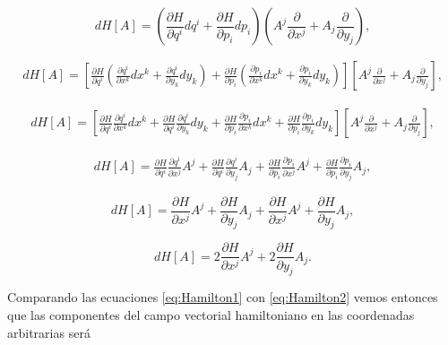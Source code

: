\documentclass[a4paper,10pt]{article}
\numberwithin{equation}{section}
\begin{document}
\begin{equation}
 dH[A] = \left( \frac{\partial H}{\partial q^i}dq^i + \frac{\partial H}{\partial p_i}dp_i\right)
 \left(A^j\frac{\partial}{\partial x^j} + A_j \frac{\partial}{\partial y_j}\right),
\end{equation}

\begin{align*}
 dH[A] = \left[ \frac{\partial H}{\partial q^i}\left(\frac{\partial q^i}{\partial x^k}dx^k + \frac{\partial q^i}{\partial y_k}dy_k  \right)
 + \frac{\partial H}{\partial p_i}\left(\frac{\partial p_i}{\partial x^k}dx^k + \frac{\partial p_i}{\partial y_k}dy_k  \right)\right]
 \left[A^j\frac{\partial}{\partial x^j} + A_j \frac{\partial}{\partial y_j}\right],
\end{align*}

\begin{align*}
 dH[A] = \left[ \frac{\partial H}{\partial q^i}\frac{\partial q^i}{\partial x^k}dx^k + \frac{\partial H}{\partial q^i}\frac{\partial q^i}{\partial y_k}dy_k
 + \frac{\partial H}{\partial p_i}\frac{\partial p_i}{\partial x^k}dx^k + \frac{\partial H}{\partial p_i}\frac{\partial p_i}{\partial y_k}dy_k \right]
 \left[A^j\frac{\partial}{\partial x^j} + A_j \frac{\partial}{\partial y_j}\right],
\end{align*}

\begin{align}
 dH[A] = \frac{\partial H}{\partial q^i}\frac{\partial q^i}{\partial x^j}A^j + \frac{\partial H}{\partial q^i}\frac{\partial q^i}{\partial y_j}A_j
 + \frac{\partial H}{\partial p_i}\frac{\partial p_i}{\partial x^j}A^j + \frac{\partial H}{\partial p_i}\frac{\partial p_i}{\partial y_j}A_j,
\end{align}

\begin{equation}
 dH[A] =  \frac{\partial H}{\partial x^j}A^j + \frac{\partial H}{\partial y_j}A_j
 + \frac{\partial H}{\partial x^j}A^j + \frac{\partial H}{\partial y_j}A_j,
\end{equation}

\begin{equation}
 dH[A] =  2\frac{\partial H}{\partial x^j}A^j + 2\frac{\partial H}{\partial y_j}A_j.
 \label{eq:Hamilton2}
\end{equation}

Comparando las ecuaciones \eqref{eq:Hamilton1} con \eqref{eq:Hamilton2} vemos entonces 
que las componentes del campo vectorial hamiltoniano en las coordenadas arbitrarias será 
\end{document}
